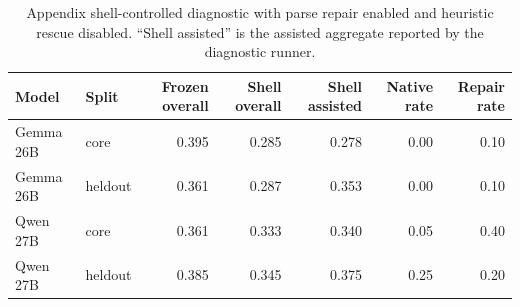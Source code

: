 \begin{table}[t]
  \centering
  \scriptsize
  \setlength{\tabcolsep}{4pt}
  \begin{tabular}{llrrrrr}
    \toprule
    Model & Split & Frozen overall & Shell overall & Shell assisted & Native rate & Repair rate \\
    \midrule
    Gemma 26B & core & 0.395 & 0.285 & 0.278 & 0.00 & 0.10 \\
    Gemma 26B & heldout & 0.361 & 0.287 & 0.353 & 0.00 & 0.10 \\
    Qwen 27B & core & 0.361 & 0.333 & 0.340 & 0.05 & 0.40 \\
    Qwen 27B & heldout & 0.385 & 0.345 & 0.375 & 0.25 & 0.20 \\
    \bottomrule
  \end{tabular}
  \caption{Appendix shell-controlled diagnostic with parse repair enabled and heuristic rescue disabled. ``Shell assisted'' is the assisted aggregate reported by the diagnostic runner.}
  \label{tab:shelldiagnostic}
\end{table}
